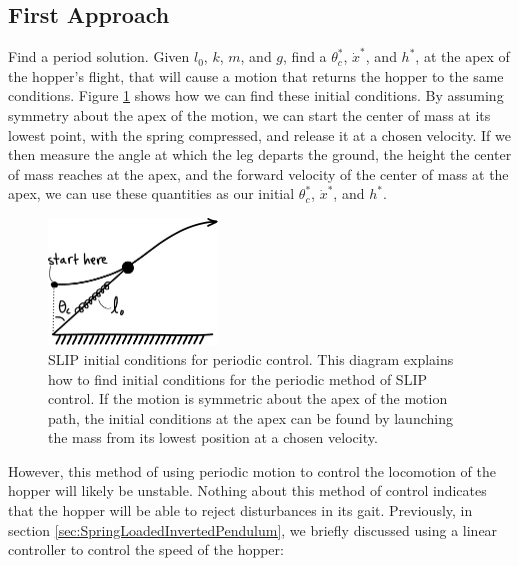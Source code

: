 \subsection*{First Approach} Find a period solution. Given $l_{0}$, $k$, $m$, and $g$, find a $\theta_{c}^{*}$, $\dot{x}^{*}$, and $h^{*}$, at the apex of the hopper's flight, that will cause a motion that returns the hopper to the same conditions. Figure \ref{fig:SLIPPeriodicMotion} shows how we can find these initial conditions. By assuming symmetry about the apex of the motion, we can start the center of mass at its lowest point, with the spring compressed, and release it at a chosen velocity. If we then measure the angle at which the leg departs the ground, the height the center of mass reaches at the apex, and the forward velocity of the center of mass at the apex, we can use these quantities as our initial $\theta_{c}^{*}$, $\dot{x}^{*}$, and $h^{*}$.

\begin{figure}[h]		%
\begin{centering}
\includegraphics[width=0.4\textwidth]{Figures/SLIPPeriodicMotion}\par
\end{centering}
\caption[Diagram: SLIP Initial Conditions for Periodic Control]{SLIP initial conditions for periodic control. This diagram explains how to find initial conditions for the periodic method of SLIP control. If the motion is symmetric about the apex of the motion path, the initial conditions at the apex can be found by launching the mass from its lowest position at a chosen velocity.}
\label{fig:SLIPPeriodicMotion}
\end{figure}
%

However, this method of using periodic motion to control the locomotion of the hopper will likely be unstable. Nothing about this method of control indicates that the hopper will be able to reject disturbances in its gait. Previously, in section \ref{sec:SpringLoadedInvertedPendulum}, we briefly discussed using a linear controller to control the speed of the hopper: 

